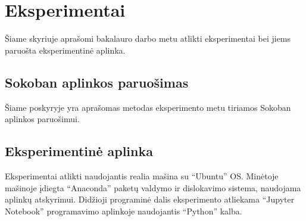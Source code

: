 \documentclass{VUMIFPSbakalaurinis}
\begin{document}
\section{Eksperimentai}
{
	Šiame skyriuje aprašomi bakalauro darbo metu atlikti eksperimentai bei jiems paruošta eksperimentinė aplinka.
}
\subsection{Sokoban aplinkos paruošimas}
{
	Šiame poskyryje yra aprašomas metodas eksperimento metu tiriamos Sokoban aplinkos paruošimui.
}
\subsubsection{}


\subsection{Eksperimentinė aplinka}
{
	Eksperimentai atlikti naudojantis realia mašina su \enquote{Ubuntu} OS. Minėtoje mašinoje įdiegta \enquote{Anaconda} paketų valdymo ir dislokavimo sistema, naudojama aplinkų atskyrimui. Didžioji programinė dalis eksperimento atliekama \enquote{Jupyter Notebook} programavimo aplinkoje naudojantis \enquote{Python} kalba.
}
\end{document}
